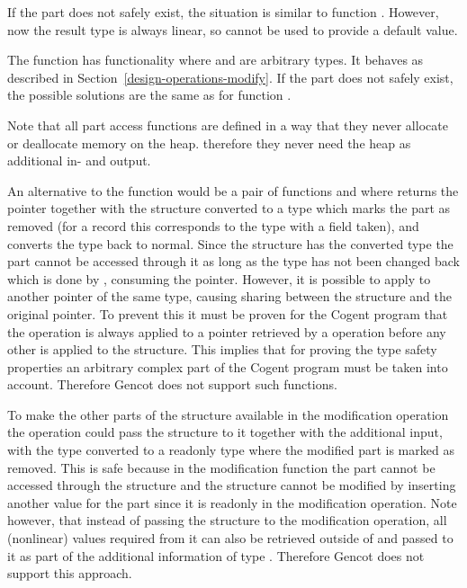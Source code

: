 If the part does not safely exist, the situation is similar to function . However, now the result 
type  is always linear, so  cannot be used to provide a default value.

The function  has functionality  where  and  are
arbitrary types. It behaves as described in Section~\ref{design-operations-modify}. If the part does not safely exist, 
the possible solutions are the same as for function .

Note that all part access functions are defined in a way that they never allocate or deallocate memory on the heap.
therefore they never need the heap as additional in- and output.

An alternative to the function  would be a pair of functions  and  where 
returns the pointer together with the structure converted to a type which marks the part as removed (for a record this
corresponds to the type with a field taken), and  converts the type back to normal. 
Since the structure has the converted type the part cannot be accessed through it
as long as the type has not been changed back which is done by , consuming the pointer.
However, it is possible to apply  to another pointer of the same type, causing sharing between the 
structure and the original pointer. To prevent this it must be proven for the Cogent program that the 
operation is always applied to a pointer retrieved by a  operation before any other 
is applied to the structure. This implies that
for proving the type safety properties an arbitrary complex part of the Cogent program must be taken into
account. Therefore Gencot does not support such functions.

To make the other parts of the structure available in the modification operation the  operation could
pass the structure to it together with the additional input, with the type converted to a readonly type where the modified
part is marked as removed. This is safe because in the modification function the part cannot be accessed
through the structure and the structure cannot be modified by inserting another value for the part since it is
readonly in the modification operation. Note however, that instead of passing the structure to the modification operation,
all (nonlinear) values required from it can also be retrieved outside of  and passed to it as part of the 
additional information of type . Therefore Gencot does not support this approach.

